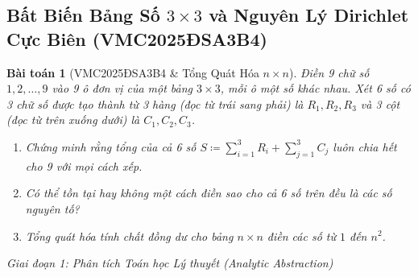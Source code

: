 \documentclass{article}
\newtheorem{baitoan}{Bài toán}
\begin{document}


\subsection{Bất Biến Bảng Số $3 \times 3$ và Nguyên Lý Dirichlet Cực Biên (VMC2025ĐSA3B4)}

\begin{baitoan}[VMC2025ĐSA3B4 \& Tổng Quát Hóa $n \times n$]
Điền 9 chữ số $1, 2, \dots, 9$ vào 9 ô đơn vị của một bảng $3 \times 3$, mỗi ô một số khác nhau. Xét 6 số có 3 chữ số được tạo thành từ 3 hàng (đọc từ trái sang phải) là $R_1, R_2, R_3$ và 3 cột (đọc từ trên xuống dưới) là $C_1, C_2, C_3$.
\begin{enumerate}
    \item[(a)] Chứng minh rằng tổng của cả 6 số $S \coloneqq \sum_{i=1}^3 R_i + \sum_{j=1}^3 C_j$ luôn chia hết cho 9 với mọi cách xếp.
    \item[(b)] Có thể tồn tại hay không một cách điền sao cho cả 6 số trên đều là các số nguyên tố?
    \item[(c)] Tổng quát hóa tính chất đồng dư cho bảng $n \times n$ điền các số từ $1$ đến $n^2$.
\end{enumerate}
\end{baitoan}

\vspace{0.5em}\noindent\emph{Giai đoạn 1: Phân tích Toán học Lý thuyết (Analytic Abstraction)}
\end{document}

